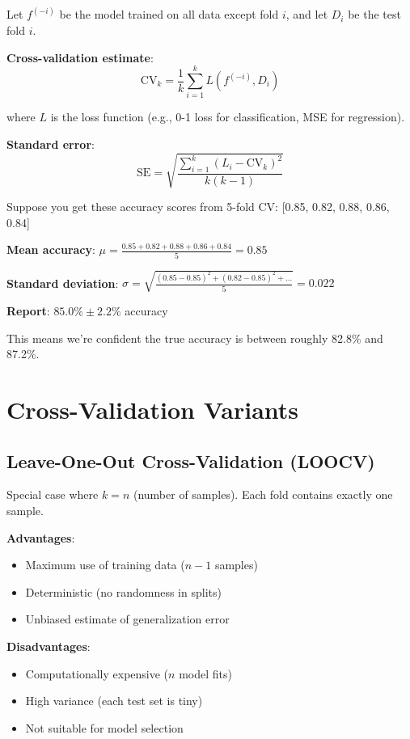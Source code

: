 \documentclass{article}
\newcounter{example}
\begin{document}
Let $f^{(-i)}$ be the model trained on all data except fold $i$, and let $D_i$ be the test fold $i$.

\textbf{Cross-validation estimate}:
$$\text{CV}_k = \frac{1}{k} \sum_{i=1}^k L(f^{(-i)}, D_i)$$

where $L$ is the loss function (e.g., 0-1 loss for classification, MSE for regression).

\textbf{Standard error}:
$$\text{SE} = \sqrt{\frac{\sum_{i=1}^k (L_i - \text{CV}_k)^2}{k(k-1)}}$$

\begin{tcolorbox}[colback=blue!5!white,colframe=blue!75!black,title=Example \stepcounter{example}\#\theexample: 5-Fold CV Calculation]

Suppose you get these accuracy scores from 5-fold CV: [0.85, 0.82, 0.88, 0.86, 0.84]

\textbf{Mean accuracy}: $\mu = \frac{0.85 + 0.82 + 0.88 + 0.86 + 0.84}{5} = 0.85$

\textbf{Standard deviation}: $\sigma = \sqrt{\frac{(0.85-0.85)^2 + (0.82-0.85)^2 + \ldots}{5}} = 0.022$

\textbf{Report}: $85.0\% \pm 2.2\%$ accuracy

This means we're confident the true accuracy is between roughly 82.8\% and 87.2\%.
\end{tcolorbox}

\section{Cross-Validation Variants}

\subsection{Leave-One-Out Cross-Validation (LOOCV)}

Special case where $k = n$ (number of samples). Each fold contains exactly one sample.

\textbf{Advantages}:
\begin{itemize}
    \item Maximum use of training data ($n-1$ samples)
    \item Deterministic (no randomness in splits)
    \item Unbiased estimate of generalization error
\end{itemize}

\textbf{Disadvantages}:
\begin{itemize}
    \item Computationally expensive ($n$ model fits)
    \item High variance (each test set is tiny)
    \item Not suitable for model selection
\end{itemize}
\end{document}
